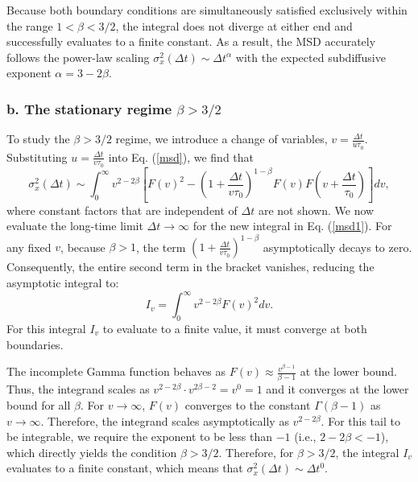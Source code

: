 \documentclass[aps, prl, longbibliography, linenumbers, superscriptaddress]{revtex4-2}
\begin{document}
Because both boundary conditions are simultaneously satisfied exclusively within the range $1 < \beta < 3/2$, the integral does not diverge at either end and successfully evaluates to a finite constant. As a result, the MSD accurately follows the power-law scaling $\sigma_x^2(\Delta t) \sim \Delta t^\alpha$ with the expected subdiffusive exponent $\alpha = 3 - 2\beta$.

\subsubsection{b. The stationary regime $\beta > 3/2$}

To study the $\beta > 3/2$ regime, we introduce a change of variables, $v = \frac{\Delta t}{u\tau_0}$. Substituting $u = \frac{\Delta t}{v\tau_0}$ into Eq. (\ref{msd}), we find that 
\begin{equation}
	\sigma_x^2(\Delta t) \sim \int_0^\infty v^{2-2\beta} \left[ F(v)^2 - \left(1 + \frac{\Delta t}{v\tau_0}\right)^{1-\beta} F(v) F\left(v + \frac{\Delta t}{\tau_0}\right) \right] dv,\label{msd1}
\end{equation}
where constant factors that are independent of $\Delta t$ are not shown. We now evaluate the long-time limit $\Delta t \to \infty$ for the new integral in Eq. (\ref{msd1}). For any fixed $v$, because $\beta > 1$, the term $\left(1 + \frac{\Delta t}{v\tau_0}\right)^{1-\beta}$ asymptotically decays to zero. Consequently, the entire second term in the bracket vanishes, reducing the asymptotic integral to:
\begin{equation}
	I_v = \int_0^\infty v^{2-2\beta} F(v)^2 dv.
\end{equation}
For this integral $I_v$ to evaluate to a finite value, it must converge at both boundaries. 

The incomplete Gamma function behaves as $F(v) \approx \frac{v^{\beta-1}}{\beta-1}$ at the lower bound. Thus, the integrand scales as $v^{2-2\beta} \cdot v^{2\beta-2} = v^0 = 1$ and it converges at the lower bound for all $\beta$. For $v\rightarrow \infty$, $F(v)$ converges to the constant $\Gamma(\beta-1)$ as $v \to \infty$. Therefore, the integrand scales asymptotically as $v^{2-2\beta}$. For this tail to be integrable, we require the exponent to be less than $-1$ (i.e., $2 - 2\beta < -1$), which directly yields the condition $\beta > 3/2$. Therefore, for $\beta > 3/2$, the integral $I_v$ evaluates to a finite constant, which means that $\sigma_x^2(\Delta t) \sim \Delta t^{0}$.


\end{document}
